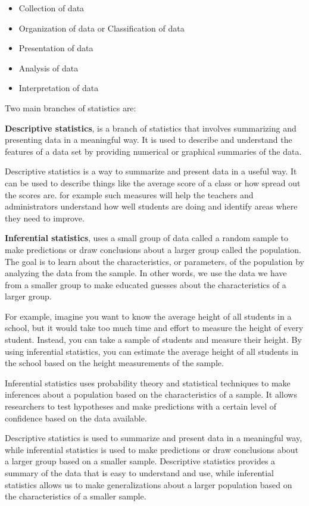 \documentclass[
]{book}
\begin{document}
\begin{itemize}
\item
  Collection of data
\item
  Organization of data or Classification of data
\item
  Presentation of data
\item
  Analysis of data
\item
  Interpretation of data
\end{itemize}

Two main branches of statistics are:

\textbf{Descriptive statistics}, is a branch of statistics that involves summarizing and presenting data in a meaningful way. It is used to describe and understand the features of a data set by providing numerical or graphical summaries of the data.

Descriptive statistics is a way to summarize and present data in a useful way. It can be used to describe things like the average score of a class or how spread out the scores are. for example such measures will help the teachers and administrators understand how well students are doing and identify areas where they need to improve.

\textbf{Inferential statistics}, uses a small group of data called a random sample to make predictions or draw conclusions about a larger group called the population. The goal is to learn about the characteristics, or parameters, of the population by analyzing the data from the sample. In other words, we use the data we have from a smaller group to make educated guesses about the characteristics of a larger group.

For example, imagine you want to know the average height of all students in a school, but it would take too much time and effort to measure the height of every student. Instead, you can take a sample of students and measure their height. By using inferential statistics, you can estimate the average height of all students in the school based on the height measurements of the sample.

Inferential statistics uses probability theory and statistical techniques to make inferences about a population based on the characteristics of a sample. It allows researchers to test hypotheses and make predictions with a certain level of confidence based on the data available.

Descriptive statistics is used to summarize and present data in a meaningful way, while inferential statistics is used to make predictions or draw conclusions about a larger group based on a smaller sample. Descriptive statistics provides a summary of the data that is easy to understand and use, while inferential statistics allows us to make generalizations about a larger population based on the characteristics of a smaller sample.
\end{document}
